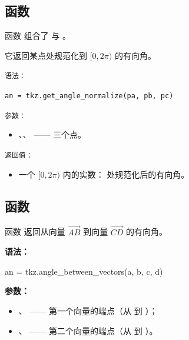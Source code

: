 

\subsection{函数 }
\label{sub:tkz.get_angle_normalize}

函数  组合了
 与 。

它返回某点处规范化到 $[0, 2\pi)$ 的有向角。

\medskip
\texttt{语法：}

\begin{mybox}
\verb|an = tkz.get_angle_normalize(pa, pb, pc)|
\end{mybox}

\medskip
\texttt{参数：}
\begin{itemize}
  \item {}、、 —— 三个点。
\end{itemize}

\medskip
\texttt{返回值：}
\begin{itemize}
  \item 一个 $[0, 2\pi)$ 内的实数： 处规范化后的有向角。
\end{itemize}


\subsection{函数 }
\label{sub:tkz_angle_between_vectors}

函数  返回从向量 $\overrightarrow{AB}$ 到向量 $\overrightarrow{CD}$ 的有向角。

\medskip
\noindent\textbf{语法：}
\begin{mybox}
an = tkz.angle\_between\_vectors(a, b, c, d)
\end{mybox}

\noindent\textbf{参数：}
\begin{itemize}
  \item {}、 —— 第一个向量的端点（从  到 ）；
  \item {}、 —— 第二个向量的端点（从  到 ）。
\end{itemize}

